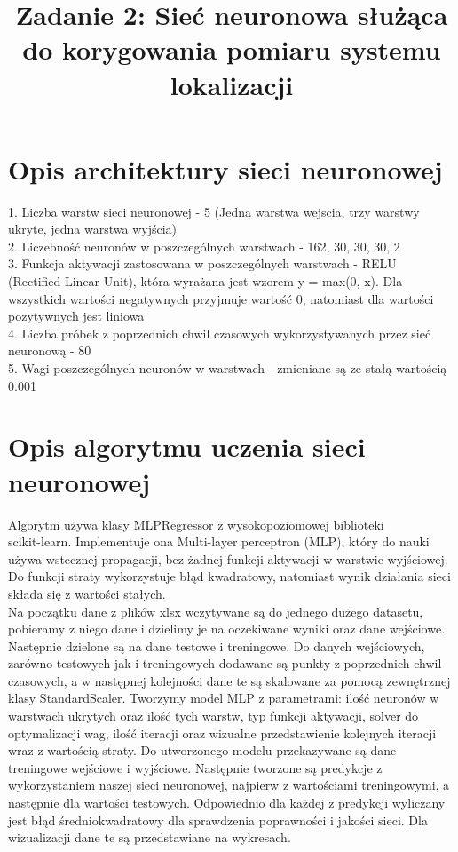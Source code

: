 \documentclass{classrep}
\author{
  \studentinfo{Maciej Pracucik}{216869} \and
  \studentinfo{Adam Jóźwiak}{216786}
}
\title{\textbf{Zadanie 2: Sieć neuronowa służąca do korygowania pomiaru systemu lokalizacji}}
\begin{document}
\maketitle

\section{Opis architektury sieci neuronowej}
{
	1. Liczba warstw sieci neuronowej - 5 (Jedna warstwa wejscia, trzy warstwy ukryte, jedna warstwa wyjścia) \\
	2. Liczebność neuronów w poszczególnych warstwach - 162, 30, 30, 30, 2 \\
	3. Funkcja aktywacji zastosowana w poszczególnych warstwach - RELU \\ (Rectified Linear Unit), która wyrażana jest wzorem y = max(0, x). Dla wszystkich wartości negatywnych przyjmuje wartość 0, natomiast dla wartości pozytywnych jest liniowa \\
	4. Liczba próbek z poprzednich chwil czasowych wykorzystywanych przez sieć neuronową - 80 \\
	5. Wagi poszczególnych neuronów w warstwach - zmieniane są ze stałą wartością 0.001 \\
 }

\section{Opis algorytmu uczenia sieci neuronowej}
{
	Algorytm używa klasy MLPRegressor z wysokopoziomowej biblioteki \\scikit-learn. Implementuje ona Multi-layer perceptron (MLP), który do nauki używa wstecznej propagacji, bez żadnej 
	funkcji aktywacji w warstwie wyjściowej. Do funkcji straty wykorzystuje błąd kwadratowy, natomiast wynik działania sieci składa się z wartości stałych. \\
	Na początku dane z plików xlsx wczytywane są do jednego dużego datasetu, pobieramy z niego dane i dzielimy je na oczekiwane wyniki oraz dane wejściowe.
	Następnie dzielone są na dane testowe i treningowe.
	Do danych wejściowych, zarówno testowych jak i treningowych dodawane są punkty z poprzednich chwil czasowych, a w następnej kolejności dane te są skalowane za pomocą zewnętrznej klasy StandardScaler. Tworzymy model MLP z parametrami: ilość neuronów w warstwach ukrytych oraz ilość tych warstw, typ funkcji aktywacji, solver do optymalizacji wag, ilość iteracji oraz wizualne 		przedstawienie kolejnych iteracji wraz z wartością straty. Do utworzonego modelu przekazywane są dane treningowe wejściowe i wyjściowe. Następnie tworzone są predykcje z wykorzystaniem naszej sieci neuronowej, najpierw z wartościami treningowymi, a następnie dla wartości testowych. Odpowiednio dla  każdej z predykcji wyliczany jest błąd średniokwadratowy dla sprawdzenia 			poprawności i jakości sieci. Dla wizualizacji dane te są przedstawiane na wykresach.
}
\end{document}
